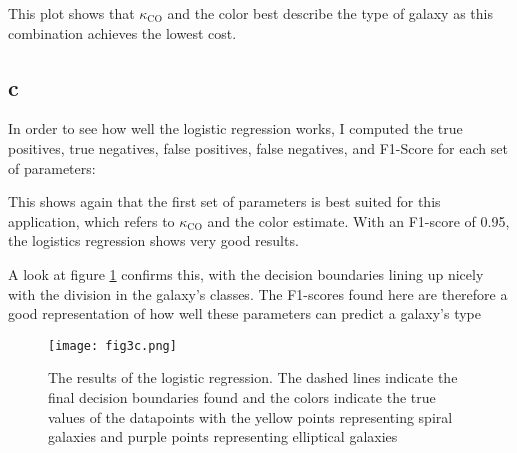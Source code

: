 This plot shows that $\kappa_{\text{CO}}$ and the color best describe the type of galaxy as this combination achieves the lowest cost.




\subsection*{c}
In order to see how well the logistic regression works, I computed the true positives, true negatives, false positives, false negatives, and F1-Score for each set of parameters:


This shows again that the first set of parameters is best suited for this application, which refers to $\kappa_{\text{CO}}$ and the color estimate.
With an F1-score of 0.95, the logistics regression shows very good results.

A look at figure \ref{fig:3c} confirms this, with the decision boundaries lining up nicely with the division in the galaxy's classes. The F1-scores found here are therefore a good representation of how well these parameters can predict a galaxy's type

\begin{figure}
	\centering
    \texttt{[image: fig3c.png]}
    \caption{The results of the logistic regression. The dashed lines indicate the final decision boundaries found and the colors indicate the true values of the datapoints with the yellow points representing spiral galaxies and purple points representing elliptical galaxies}
    \label{fig:3c}
\end{figure}



